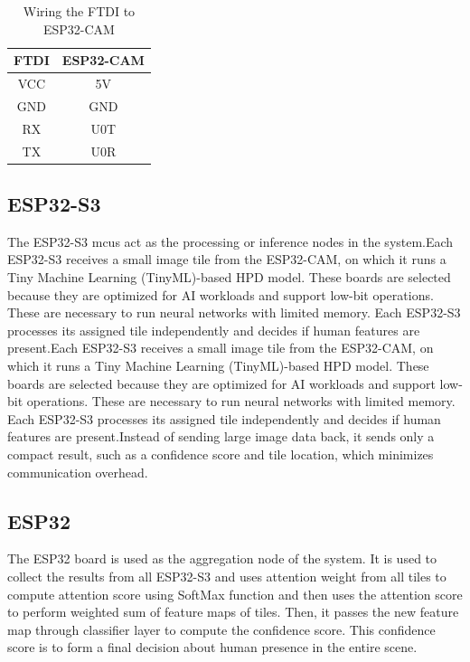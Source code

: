 \begin{table}[h]
\centering
\caption{Wiring the FTDI to ESP32-CAM}
\begin{tabular}{|c|c|}
\hline
\textbf{FTDI} & \textbf{ESP32-CAM} \\ \hline
VCC           & 5V                 \\ \hline
GND           & GND                \\ \hline
RX            & U0T                \\ \hline
TX            & U0R                \\ \hline
\end{tabular}
\end{table}

\subsection{\textbf{ESP32-S3}}
The ESP32-S3 \glspl{mcu} act as the processing or inference nodes in the system.Each ESP32-S3 receives a small image tile from the ESP32-CAM, on which it runs a Tiny Machine Learning (TinyML)-based HPD model. These boards are selected because they are optimized for AI workloads and support low-bit operations. These are necessary to run neural networks with limited memory. Each ESP32-S3 processes its assigned tile independently and decides if human features are present.Each ESP32-S3 receives a small image tile from the ESP32-CAM, on which it runs a Tiny Machine Learning (TinyML)-based HPD model. These boards are selected because they are optimized for AI workloads and support low-bit operations. These are necessary to run neural networks with limited memory. Each ESP32-S3 processes its assigned tile independently and decides if human features are present.Instead of sending large image data back, it sends only a compact result, such as a confidence score and tile location, which minimizes communication overhead.

 \subsection{\textbf{ESP32}}
The ESP32 board is used as the aggregation node of the system. It is used to collect the results from all ESP32-S3 and uses attention weight from all tiles to compute attention score using SoftMax function and then uses the attention score to perform weighted sum of feature maps of tiles. Then, it passes the new feature map through classifier layer to compute the confidence score. This confidence score is to form a final decision about human presence in the entire scene. 


